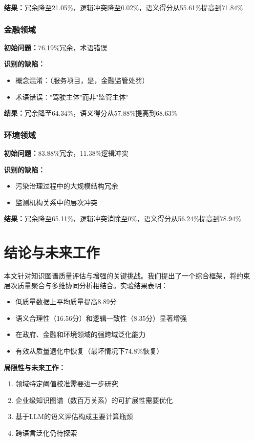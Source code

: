 \documentclass[runningheads]{llncs}
\begin{document}
\textbf{结果：}冗余降至21.05\%，逻辑冲突降至0.02\%，语义得分从55.61\%提高到71.84\%

\subsubsection{金融领域}
\textbf{初始问题：}76.19\%冗余，术语错误

\textbf{识别的缺陷：}
\begin{itemize}
    \item 概念混淆：（服务项目，是，金融监管处罚）
    \item 术语错误："驾驶主体"而非"监管主体"
\end{itemize}

\textbf{结果：}冗余降至64.34\%，语义得分从57.88\%提高到68.63\%

\subsubsection{环境领域}
\textbf{初始问题：}83.88\%冗余，11.38\%逻辑冲突

\textbf{识别的缺陷：}
\begin{itemize}
    \item 污染治理过程中的大规模结构冗余
    \item 监测机构关系中的层次冲突
\end{itemize}

\textbf{结果：}冗余降至65.11\%，逻辑冲突消除至0\%，语义得分从56.24\%提高到78.94\%

\section{结论与未来工作}

本文针对知识图谱质量评估与增强的关键挑战。我们提出了一个综合框架，将约束层次质量聚合与多维协同分析相结合。实验结果表明：

\begin{itemize}
    \item 低质量数据上平均质量提高8.89分
    \item 语义合理性（16.56分）和逻辑一致性（8.35分）显著增强
    \item 在政府、金融和环境领域的强跨域泛化能力
    \item 有效从质量退化中恢复（最坏情况下74.8\%恢复）
\end{itemize}

\textbf{局限性与未来工作：}
\begin{enumerate}
    \item 领域特定阈值校准需要进一步研究
    \item 企业级知识图谱（数百万关系）的可扩展性需要优化
    \item 基于LLM的语义评估构成主要计算瓶颈
    \item 跨语言泛化仍待探索
\end{enumerate}
\end{document}

